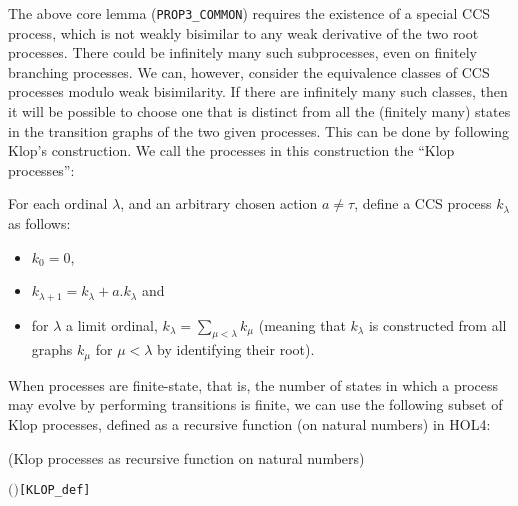 The above core lemma (\texttt{PROP3_COMMON}) requires the
existence of a special CCS process, which is not weakly bisimilar to
any weak derivative of the two root processes.
There could be infinitely many such subprocesses, even on finitely
branching processes.
We can, however, consider the equivalence classes of CCS processes
modulo weak bisimilarity.
If there are infinitely many such classes, 
then it will be 
possible to choose one that is distinct from all the (finitely many) states in the
transition graphs of the two given processes.
This can be done by following Klop's construction. %
 We call the processes in this construction the ``Klop processes'':
\begin{definition}
For each ordinal $\lambda$, and an arbitrary chosen action $a \neq \tau$,
define a CCS process $k_\lambda$ as follows:
\begin{itemize}
\item $k_0 = 0$,
\item $k_{\lambda+1} = k_\lambda + a.k_\lambda$ and
\item for $\lambda$ a limit ordinal, $k_\lambda = \sum_{\mu < \lambda}
  k_\mu$ (meaning that $k_\lambda$ is constructed from all graphs
  $k_\mu$ for $\mu < \lambda$ by identifying their root).
\end{itemize}
\end{definition}
When processes are finite-state, that is,
the number of  states in which a process may evolve by performing
transitions is finite, 
we can use  the following subset of Klop processes, 
defined as a recursive function (on natural numbers) in HOL4:
\begin{definition}{(Klop processes as recursive function on natural numbers)}
\begin{alltt}
      \HOLTokenDefEquality{} 
     \ensuremath{(} \ensuremath{)} \HOLTokenDefEquality{}    \HOLSymConst{\ensuremath{+}}  \HOLSymConst{\ensuremath{\ldotp}}  \hfill{[KLOP_def]}
\end{alltt}
\end{definition}

